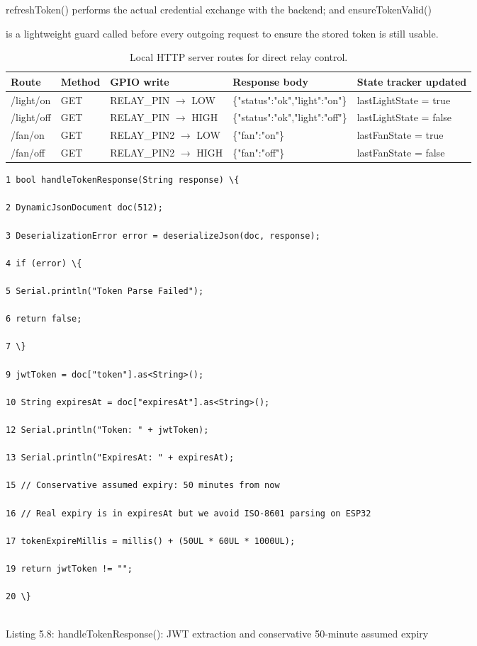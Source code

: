 refreshToken() performs the actual credential exchange with the backend; and ensureTokenValid()

is a lightweight guard called before every outgoing request to ensure the stored token is still usable.

\begin{table}[htbp]
	\centering
	\caption{Local HTTP server routes for direct relay control.}
	\label{tab:5-2}
	\begin{tabular}{lllll}
		\toprule
		Route      & Method & GPIO write                     & Response body                   & State tracker updated  \\
		\midrule
		/light/on  & GET    & RELAY\_PIN $\rightarrow$ LOW   & \{"status":"ok","light":"on"\}  & lastLightState = true  \\
		/light/off & GET    & RELAY\_PIN $\rightarrow$ HIGH  & \{"status":"ok","light":"off"\} & lastLightState = false \\
		/fan/on    & GET    & RELAY\_PIN2 $\rightarrow$ LOW  & \{"fan":"on"\}                  & lastFanState = true    \\
		/fan/off   & GET    & RELAY\_PIN2 $\rightarrow$ HIGH & \{"fan":"off"\}                 & lastFanState = false   \\
		\bottomrule
	\end{tabular}
\end{table}

\begin{listingbox}
	\begin{verbatim}
1 bool handleTokenResponse(String response) \{

2 DynamicJsonDocument doc(512);

3 DeserializationError error = deserializeJson(doc, response);

4 if (error) \{

5 Serial.println("Token Parse Failed");

6 return false;

7 \}

9 jwtToken = doc["token"].as<String>();

10 String expiresAt = doc["expiresAt"].as<String>();

12 Serial.println("Token: " + jwtToken);

13 Serial.println("ExpiresAt: " + expiresAt);

15 // Conservative assumed expiry: 50 minutes from now

16 // Real expiry is in expiresAt but we avoid ISO-8601 parsing on ESP32

17 tokenExpireMillis = millis() + (50UL * 60UL * 1000UL);

19 return jwtToken != "";

20 \}


\end{verbatim}
\end{listingbox}
Listing 5.8: handleTokenResponse(): JWT extraction and conservative 50-minute assumed expiry

